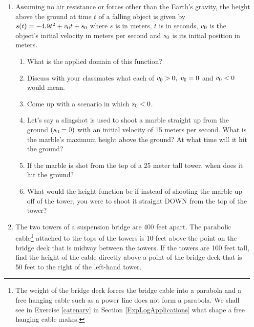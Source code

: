 \begin{enumerate}
\newpage

\item Assuming no air resistance or forces other than the Earth's gravity, the height above the ground at time $t$ of a falling object is given by $s(t) = -4.9t^{2} + v_{\mbox{\scriptsize $0$}}t + s_{\mbox{\scriptsize $0$}}$ where $s$ is in meters, $t$ is in seconds, $v_{\mbox{\scriptsize $0$}}$ is the object's initial velocity in meters per second and $s_{\mbox{\scriptsize $0$}}$ is its initial position in meters.  
\label{whatgoesup}

\begin{enumerate}

\item What is the applied domain of this function?
\item Discuss with your classmates what each of $v_{\mbox{\scriptsize $0$}} > 0, \; v_{\mbox{\scriptsize $0$}} = 0$ and $v_{\mbox{\scriptsize $0$}} < 0$ would mean.
\item Come up with a scenario in which $s_{\mbox{\scriptsize $0$}} < 0$.
\item Let's say a slingshot is used to shoot a marble straight up from the ground $(s_{\mbox{\scriptsize $0$}} = 0)$ with an initial velocity of 15 meters per second.  What is the marble's maximum height above the ground?  At what time will it hit the ground?
\item If the marble is shot from the top of a 25 meter tall tower,  when does it hit the ground?
\item What would the height function be if instead of shooting the marble up off of the tower, you were to shoot it straight DOWN from the top of the tower?

\end{enumerate}


\item \label{parabolicbridgecable} The two towers of a suspension bridge are 400 feet apart.  The parabolic cable\footnote{The weight of the bridge deck forces the bridge cable into a parabola and a free hanging cable such as a power line does not form a parabola.  We shall see in Exercise \ref{catenary} in Section \ref{ExpLogApplications} what shape a free hanging cable makes.} attached to the tops of the towers is 10 feet above the point on the bridge deck that is midway between the towers.  If the towers are 100 feet tall, find the height of the cable directly above a point of the bridge deck that is 50 feet to the right of the left-hand tower.


\end{enumerate}
